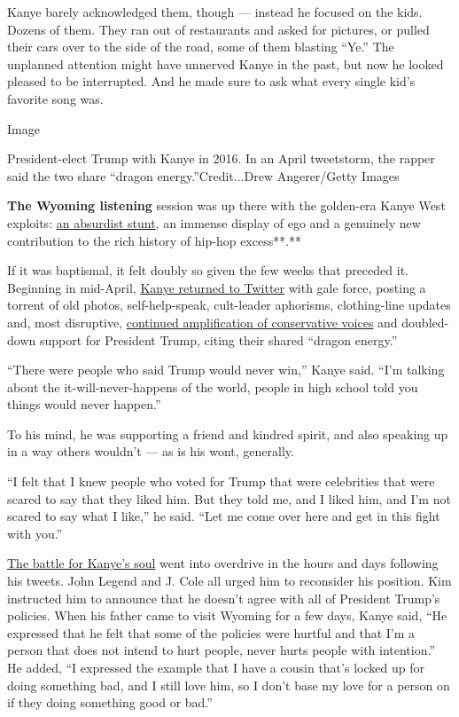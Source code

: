 Kanye barely acknowledged them, though --- instead he focused on the
kids. Dozens of them. They ran out of restaurants and asked for
pictures, or pulled their cars over to the side of the road, some of
them blasting ``Ye.'' The unplanned attention might have unnerved Kanye
in the past, but now he looked pleased to be interrupted. And he made
sure to ask what every single kid's favorite song was.

Image

President-elect Trump with Kanye in 2016. In an April tweetstorm, the
rapper said the two share ``dragon energy.''Credit...Drew Angerer/Getty
Images

\textbf{The Wyoming listening} session was up there with the golden-era
Kanye West exploits:
\href{https://www.nytimes3xbfgragh.onion/2016/02/12/arts/music/kanye-west-yeezy-season-3-life-of-pablo.html}{an
absurdist stunt}, an immense display of ego and a genuinely new
contribution to the rich history of hip-hop excess**.**

If it was baptismal, it felt doubly so given the few weeks that preceded
it. Beginning in mid-April,
\href{https://www.nytimes3xbfgragh.onion/2018/04/19/arts/music/kanye-west-new-album-twitter.html}{Kanye
returned to Twitter} with gale force, posting a torrent of old photos,
self-help-speak, cult-leader aphorisms, clothing-line updates and, most
disruptive,
\href{https://www.nytimes3xbfgragh.onion/2018/04/27/arts/music/kanye-west-trump-conservatives.html}{continued
amplification of conservative voices} and doubled-down support for
President Trump, citing their shared ``dragon energy.''

``There were people who said Trump would never win,'' Kanye said. ``I'm
talking about the it-will-never-happens of the world, people in high
school told you things would never happen.''

To his mind, he was supporting a friend and kindred spirit, and also
speaking up in a way others wouldn't --- as is his wont, generally.

``I felt that I knew people who voted for Trump that were celebrities
that were scared to say that they liked him. But they told me, and I
liked him, and I'm not scared to say what I like,'' he said. ``Let me
come over here and get in this fight with you.''

\href{https://www.nytimes3xbfgragh.onion/2018/05/02/arts/music/kanye-west-truth-twitter-trump.html}{The
battle for Kanye's soul} went into overdrive in the hours and days
following his tweets. John Legend and J. Cole all urged him to
reconsider his position. Kim instructed him to announce that he doesn't
agree with all of President Trump's policies. When his father came to
visit Wyoming for a few days, Kanye said, ``He expressed that he felt
that some of the policies were hurtful and that I'm a person that does
not intend to hurt people, never hurts people with intention.'' He
added, ``I expressed the example that I have a cousin that's locked up
for doing something bad, and I still love him, so I don't base my love
for a person on if they doing something good or bad.''

